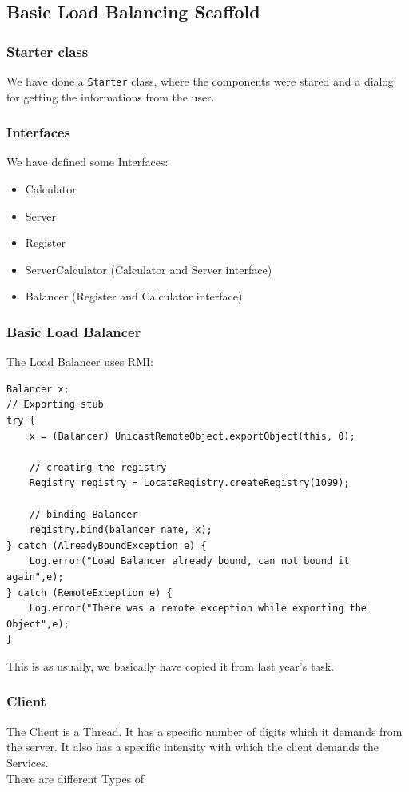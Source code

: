 \documentclass[12pt]{article}
\begin{document}
\subsection{Basic Load Balancing Scaffold} 
\subsubsection{Starter class}
We have done a \texttt{Starter} class, where the components were stared and a dialog for getting the informations from the user.
\subsubsection{Interfaces}
We have defined some Interfaces:
\begin{itemize}
\item Calculator
\item Server
\item Register
\item ServerCalculator (Calculator and Server interface)
\item Balancer (Register and Calculator interface)
\end{itemize}
\newpage
\subsubsection{Basic Load Balancer}
The Load Balancer uses RMI:
\begin{lstlisting}    
Balancer x;
// Exporting stub
try {
	x = (Balancer) UnicastRemoteObject.exportObject(this, 0);

	// creating the registry
	Registry registry = LocateRegistry.createRegistry(1099);

	// binding Balancer
	registry.bind(balancer_name, x);
} catch (AlreadyBoundException e) {
	Log.error("Load Balancer already bound, can not bound it again",e);
} catch (RemoteException e) {
	Log.error("There was a remote exception while exporting the Object",e);
}
\end{lstlisting}    
This is as usually, we basically have copied it from last year's task.
\subsubsection{Client}
The Client is a Thread. It has a specific number of digits which it demands from the server.
It also has a specific intensity with which the client demands the Services.\\
There are different Types of 
\end{document}
